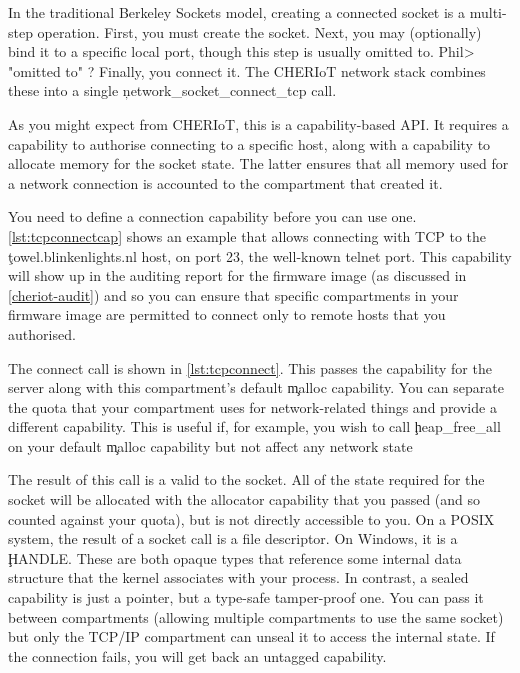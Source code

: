 In the traditional Berkeley Sockets model, creating a connected socket is a multi-step operation.
First, you must create the socket.
Next, you may (optionally) bind it to a specific local port, though this step is usually omitted to.
Phil> "omitted to" ?
Finally, you connect it.
The CHERIoT network stack combines these into a single \c{network_socket_connect_tcp} call.


As you might expect from CHERIoT, this is a capability-based API.
It requires a capability to authorise connecting to a specific host, along with a capability to allocate memory for the socket state.
The latter ensures that all memory used for a network connection is accounted to the compartment that created it.

You need to define a connection capability before you can use one.
\ref{lst:tcpconnectcap} shows an example that allows connecting with TCP to the \c{towel.blinkenlights.nl} host, on port 23, the well-known telnet port.
This capability will show up in the auditing report for the firmware image (as discussed in \ref{cheriot-audit}) and so you can ensure that specific compartments in your firmware image are permitted to connect only to remote hosts that you authorised.

\codelisting[filename=examples/tcp/tcp.cc,marker=server_capability,label=lst:tcpconnectcap,caption="A static capability that authorises connecting to a remote server."]{}

The connect call is shown in \ref{lst:tcpconnect}.
This passes the capability for the server along with this compartment's default \c{malloc} capability.
You can separate the quota that your compartment uses for network-related things and provide a different capability.
This is useful if, for example, you wish to call \c{heap_free_all} on your default \c{malloc} capability but not affect any network state

\codelisting[filename=examples/tcp/tcp.cc,marker=connect,label=lst:tcpconnect,caption="Connecting to a remote server."]{}

The result of this call is a valid  to the socket.
All of the state required for the socket will be allocated with the allocator capability that you passed (and so counted against your quota), but is not directly accessible to you.
On a POSIX system, the result of a socket call is a file descriptor.
On Windows, it is a \c{HANDLE}.
These are both opaque types that reference some internal data structure that the kernel associates with your process.
In contrast, a sealed capability is just a pointer, but a type-safe tamper-proof one.
You can pass it between compartments (allowing multiple compartments to use the same socket) but only the TCP/IP compartment can unseal it to access the internal state.
If the connection fails, you will get back an untagged capability.

